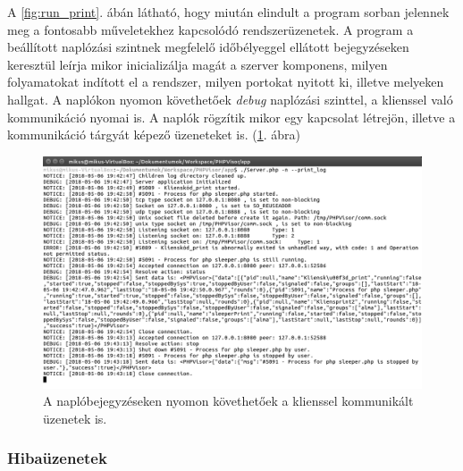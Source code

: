 \documentclass[12pt]{report}
\begin{document}
A \ref{fig:run_print}. ábán látható, hogy miután elindult a program sorban jelennek meg a fontosabb műveletekhez kapcsolódó rendszerüzenetek. A program a beállított naplózási szintnek megfelelő időbélyeggel ellátott bejegyzéseken keresztül leírja mikor inicializálja magát a szerver komponens, milyen folyamatokat indított el a rendszer, milyen portokat nyitott ki, illetve melyeken hallgat. A naplókon nyomon követhetőek \textit{debug} naplózási szinttel, a klienssel való kommunikáció nyomai is. A naplók rögzítik mikor egy kapcsolat létrejön, illetve a kommunikáció tárgyát képező üzeneteket is. (\ref{fig:runcon}. ábra)
  \begin{figure}[ht]
  \centering
  \includegraphics[width=14cm]{pics/runcon.png}
	  \caption{A naplóbejegyzéseken nyomon követhetőek a klienssel kommunikált üzenetek is. \newline}
      \label{fig:runcon}
  \end{figure}

  \subsubsection{Hibaüzenetek}
\end{document}
